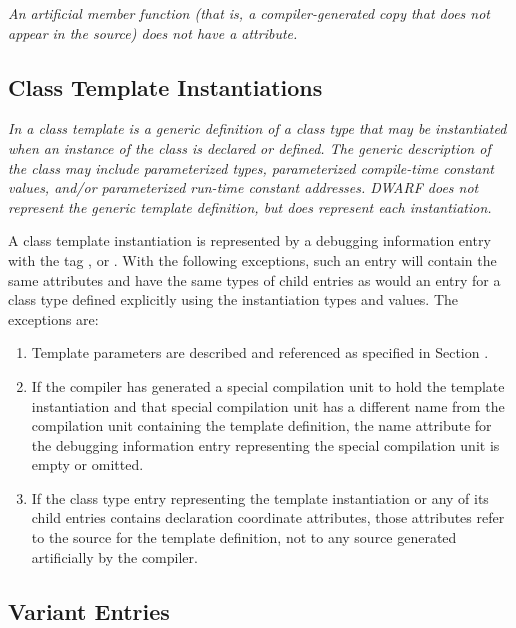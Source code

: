 {\textit{An artificial member function (that is, a compiler-generated
copy that does not appear in the source) does not have a
\DWATdefaultedNAME{} attribute.}

\subsection{Class Template Instantiations}
\label{chap:classtemplateinstantiations}

\textit{In  a class template is a generic definition of a class
type that may be instantiated when an instance of the class
is declared or defined. The generic description of the class may include
parameterized types, parameterized compile-time constant
values, and/or parameterized run-time constant addresses. 
DWARF does not represent the generic template
definition, but does represent each instantiation.}

A class template instantiation is represented by a
debugging information entry with the tag \DWTAGclasstype,
\DWTAGstructuretype{} or 
\DWTAGuniontype. With the following
exceptions, such an entry will contain the same attributes
and have the same types of child entries as would an entry
for a class type defined explicitly using the instantiation
types and values. The exceptions are:

\begin{enumerate}[1. ]
\item Template parameters are described and referenced as
specified in Section .

\item If the compiler has generated a special compilation unit to
hold the 
template instantiation and that special compilation
unit has a different name from the compilation unit containing
the template definition, the name attribute for the debugging
information entry representing the special compilation unit
is empty or omitted.

\item If the class type entry representing the template
instantiation or any of its child entries contains declaration
coordinate attributes, those attributes refer to
the source for the template definition, not to any source
generated artificially by the compiler.
\end{enumerate}

\subsection{Variant Entries}
\label{chap:variantentries}

}
